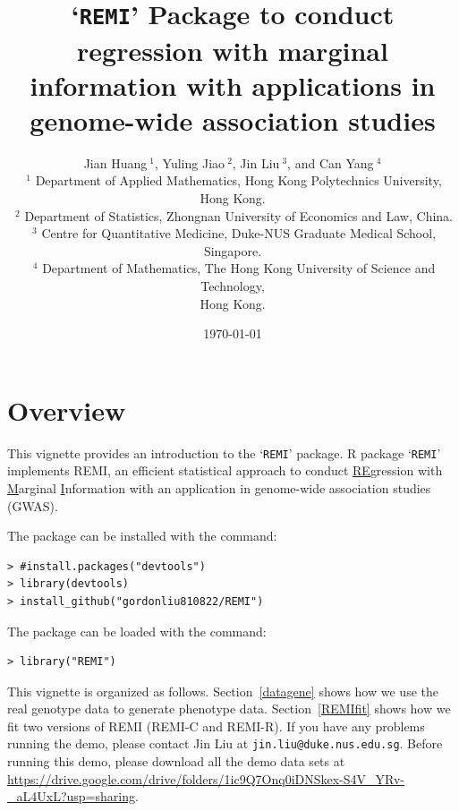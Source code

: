 \documentclass[11pt]{article}
\title{`\texttt{REMI}' Package to conduct regression with marginal information with applications in genome-wide association studies}
\author{Jian Huang$~^1$, Yuling Jiao$~^{2}$, Jin Liu$~^3$, and Can Yang$~^4$\\
$~^1$ Department of Applied Mathematics, Hong Kong Polytechnics
University, Hong Kong.\\
$~^2$ Department of Statistics, Zhongnan University of Economics and Law, China.\\
$~^3$ Centre for Quantitative Medicine, Duke-NUS Graduate Medical School, Singapore.\\
$~^4$ Department of Mathematics, The Hong Kong University of Science and Technology,\\
Hong Kong.\\
}
\date{\today}
\begin{document}

\maketitle

\section{Overview}
This vignette provides an introduction to the `\texttt{REMI}' package.
R package `\texttt{REMI}' implements REMI, an efficient statistical approach to conduct \underline{RE}gression with \underline{M}arginal \underline{I}nformation with an application in genome-wide association studies (GWAS).

The package can be installed with the command:
\begin{verbatim}
> #install.packages("devtools")
> library(devtools)
> install_github("gordonliu810822/REMI")
\end{verbatim}

The package can be loaded with the command:
\begin{verbatim}
> library("REMI")
\end{verbatim}

This vignette is organized as follows.
Section~\ref{datagene} shows how we use the real genotype data to generate phenotype data.
Section~\ref{REMIfit} shows how we fit two versions of REMI (REMI-C and REMI-R). If you have any problems running the demo, please contact Jin Liu at \texttt{jin.liu@duke.nus.edu.sg}. Before running this demo, please download all the demo data sets at \url{https://drive.google.com/drive/folders/1ic9Q7Onq0iDNSkex-S4V_YRv-_aL4UxL?usp=sharing}.
\end{document}
